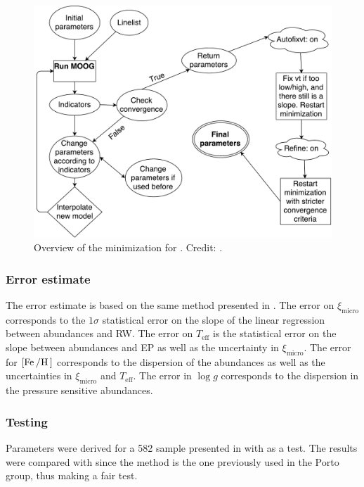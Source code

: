 \begin{figure}[htpb!]
    \centering
    \includegraphics[width=0.85\linewidth]{figures/FASMA_minimization.pdf}
    \caption{Overview of the minimization for . Credit: \citet{Andreasen2017a}.}
    \label{fig:minimization}
\end{figure}


\subsubsection{Error estimate}
\label{sec:error_estimate}

The error estimate is based on the same method presented in \citet{Neuforge1997}. The error on
$\xi_\mathrm{micro}$ corresponds to the $1\sigma$ statistical error on the slope of the linear
regression between  abundances and RW. The error on $T_\mathrm{eff}$ is the statistical
error on the slope between  abundances and EP as well as the uncertainty in
$\xi_\mathrm{micro}$. The error for $[\ion{Fe}/\ion{H}]$ corresponds to the dispersion of the
 abundances as well as the uncertainties in $\xi_\mathrm{micro}$ and $T_\mathrm{eff}$.
The error in $\log g$ corresponds to the dispersion in the pressure sensitive 
abundances.

\subsubsection{Testing }
\label{sec:fasma_test}

Parameters were derived for a 582 sample presented in \citet{Sousa2011} with  as a test.
The results were compared with \citet{Sousa2011} since the method is the one previously used in the
Porto group, thus making a fair test.

